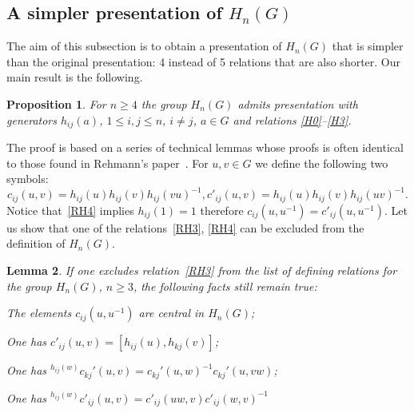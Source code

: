 \documentclass[oneside, 12pt]{amsart}
\theoremstyle{plain}
\numberwithin{equation}{section}
\newtheorem{lemma}{Lemma}
\numberwithin{lemma}{section}
\newtheorem{prop}[lemma]{Proposition}
\theoremstyle{remark}
\theoremstyle{definition}
\begin{document}
\subsection{A simpler presentation of $H_n(G)$}
The aim of this subsection is to obtain a presentation of $H_n(G)$ that is simpler than the original presentation: 4 instead of 5 relations that are also shorter. 
Our main result is the following.
\begin{prop} For $n\geq 4$ the group $H_n(G)$ admits presentation with generators $h_{ij}(a)$, $1\leq i, j\leq n$, $i\neq j$, $a\in G$ and relations \eqref{H0}--\eqref{H3}. \end{prop}
The proof is based on a series of technical lemmas whose proofs is often identical to those found in Rehmann's paper~\cite{Reh78}.
For $u, v\in G$ we define the following two symbols:
\[c_{ij}(u,v)=h_{ij}(u)h_{ij}(v)h_{ij}(vu)^{-1}, c'_{ij}(u,v)=h_{ij}(u)h_{ij}(v)h_{ij}(uv)^{-1}.\]
Notice that~\eqref{RH4} implies $h_{ij}(1)=1$ therefore $c_{ij}(u, u^{-1}) = c'_{ij}(u, u^{-1})$.
Let us show that one of the relations~\eqref{RH3}, \eqref{RH4} can be excluded from the definition of $H_n(G)$.
\begin{lemma} \label{item-lem33} If one excludes relation~\eqref{RH3} from the list of defining relations for the group $H_n(G)$, $n\geq 3$,
 the following facts still remain true:
 \begin{lemlist}
\item \label{item-lem33-cntr} The elements $c_{ij}(u, u^{-1})$ are central in $H_n(G)$;
\item \label{item-lem33-comm} One has $c'_{ij}(u, v) = [h_{ij}(u), h_{kj}(v)]$;
\item \label{item-lem33-conj}  One has ${}^{h_{ij}(w)}c_{kj}'(u, v) = c_{kj}'(u, w)^{-1} c_{kj}'(u, vw)$;
\item \label{item-lem33-conj2} One has ${}^{h_{ij}(w)} c'_{ij}(u, v) = c'_{ij}(uw, v) c'_{ij}(w, v)^{-1}$
 \end{lemlist}
\end{lemma}
\end{document}
